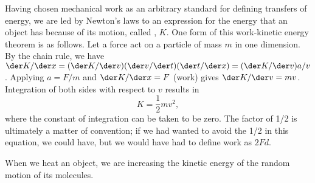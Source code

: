 Having chosen mechanical work as an arbitrary standard for defining
transfers of energy, we are led by Newton's laws to an expression for
the energy that an object has because of its motion, called ,
$K$. One form of this work-kinetic energy theorem is as follows. Let a force act on a particle of
mass $m$ in one dimension. By the chain rule, we
have $\der K/\der x=(\der K/\der v)(\der v/\der t)(\der t/\der x)=(\der K/\der v)a/v$. 
Applying  $a=F/m$ and $\der K/\der x=F$ (work) gives $\der K/\der v=mv$.
Integration of both sides with respect to $v$ results in
\begin{equation}
  K = \frac{1}{2}mv^2,
\end{equation}
where the constant of integration can be taken to be zero.
The factor of 1/2 is ultimately a matter of convention; if we had wanted to avoid
the 1/2 in this equation, we could have, but we would have had to define work as
$2Fd$.

When we heat an object, we are increasing the kinetic energy of the random motion
of its molecules.


